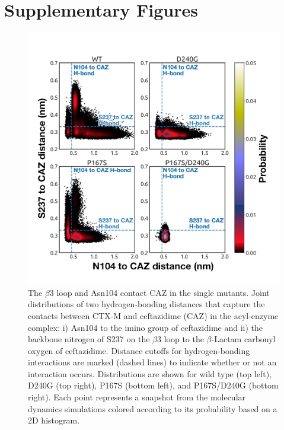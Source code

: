 \documentclass[../main.tex]{subfiles}
\begin{document}
\section{Supplementary Figures}

    \begin{figure}[!htb] %
        \centering
        \includegraphics[width=5.5in]{ch2-suppfig1.png}
        \caption[The $\beta$3 loop and Asn104 contact CAZ in the single mutants.]{The $\beta$3 loop and Asn104 contact CAZ in the single mutants. Joint distributions of two hydrogen-bonding distances that capture the contacts between CTX-M and ceftazidime (CAZ) in the acyl-enzyme complex: i) Asn104 to the imino group of ceftazidime and ii) the backbone nitrogen of S237 on the $\beta$3 loop to the $\beta$-Lactam carbonyl oxygen of ceftazidime. Distance cutoffs for hydrogen-bonding interactions are marked (dashed lines) to indicate whether or not an interaction occurs. Distributions are shown for wild type (top left), D240G (top right), P167S (bottom left), and P167S/D240G (bottom right). Each point represents a snapshot from the molecular dynamics simulations colored according to its probability based on a 2D histogram.}
        \label{fig:ch2-suppfig1}
    \end{figure} 
\end{document}
